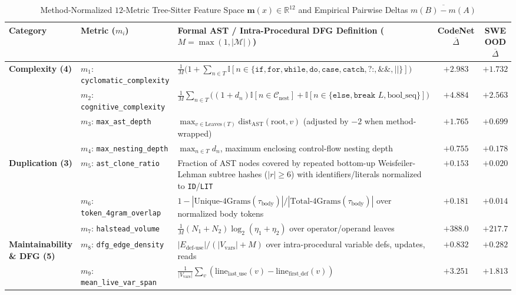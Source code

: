 \documentclass[conference]{IEEEtran}
\begin{document}
\begin{table}[t]
\centering
\caption{Method-Normalized $12$-Metric Tree-Sitter Feature Space $\mathbf{m}(x) \in \mathbb{R}^{12}$ and Empirical Pairwise Deltas $\overline{m(B) - m(A)}$}
\label{tab:metrics}
\renewcommand{\arraystretch}{1.15}
\begin{tabular}{@{}llp{8.4cm}cc@{}}
\toprule
\textbf{Category} & \textbf{Metric ($m_i$)} & \textbf{Formal AST / Intra-Procedural DFG Definition ($M = \max(1,|\mathcal{M}|)$)} & \textbf{CodeNet $\overline{\Delta}$} & \textbf{SWE OOD $\overline{\Delta}$} \\
\midrule
\multirow{4}{*}{\textbf{Complexity (4)}}
 & $m_1$: \texttt{cyclomatic\_complexity} & $\frac{1}{M}\big(1 + \sum_{n\in T}\mathbb{I}[n \in \{\texttt{if},\texttt{for},\texttt{while},\texttt{do},\texttt{case},\texttt{catch},\texttt{?:},\texttt{\&\&},\texttt{||}\}]\big)$ & $+2.983$ & $+1.732$ \\
 & $m_2$: \texttt{cognitive\_complexity} & $\frac{1}{M}\sum_{n\in T}\big((1+d_n)\mathbb{I}[n\in\mathcal{C}_{\text{nest}}] + \mathbb{I}[n\in\{\texttt{else},\texttt{break }L,\text{bool\_seq}\}]\big)$ & $+4.884$ & $+2.563$ \\
 & $m_3$: \texttt{max\_ast\_depth} & $\max_{v\in\text{Leaves}(T)}\text{dist}_{\text{AST}}(\text{root}, v)$ (adjusted by $-2$ when method-wrapped) & $+1.765$ & $+0.699$ \\
 & $m_4$: \texttt{max\_nesting\_depth} & $\max_{n\in T} d_n$, maximum enclosing control-flow nesting depth & $+0.755$ & $+0.178$ \\
\midrule
\multirow{3}{*}{\textbf{Duplication (3)}}
 & $m_5$: \texttt{ast\_clone\_ratio} & Fraction of AST nodes covered by repeated bottom-up Weisfeiler-Lehman subtree hashes ($|r|\ge 6$) with identifiers/literals normalized to \texttt{ID}/\texttt{LIT} & $+0.153$ & $+0.020$ \\
 & $m_6$: \texttt{token\_4gram\_overlap} & $1 - |\text{Unique-4Grams}(\tau_{\text{body}})| / |\text{Total-4Grams}(\tau_{\text{body}})|$ over normalized body tokens & $+0.181$ & $+0.014$ \\
 & $m_7$: \texttt{halstead\_volume} & $\frac{1}{M}(N_1 + N_2)\log_2(\eta_1 + \eta_2)$ over operator/operand leaves & $+388.0$ & $+217.7$ \\
\midrule
\multirow{5}{*}{\textbf{Maintainability \& DFG (5)}}
 & $m_8$: \texttt{dfg\_edge\_density} & $|E_{\text{def-use}}| / (|V_{\text{vars}}| + M)$ over intra-procedural variable defs, updates, reads & $+0.832$ & $+0.282$ \\
 & $m_9$: \texttt{mean\_live\_var\_span} & $\frac{1}{|V_{\text{vars}}|}\sum_{v}(\text{line}_{\text{last\_use}}(v) - \text{line}_{\text{first\_def}}(v))$ & $+3.251$ & $+1.813$ \\

\end{tabular}
\end{table}
\end{document}
